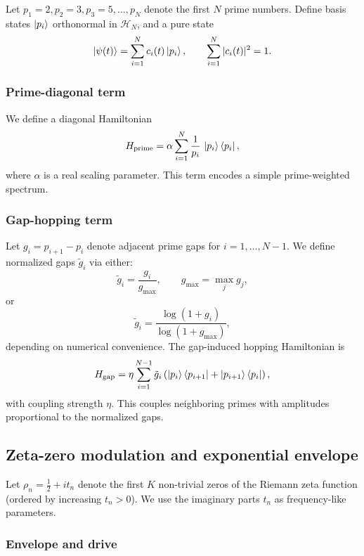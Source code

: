 \documentclass[11pt]{article}
\begin{document}
Let $p_1=2,p_2=3,p_3=5,\dots,p_N$ denote the first $N$ prime numbers. Define basis states $\ket{p_i}$ orthonormal in $\mathcal{H}_N$, and a pure state
\[
\ket{\psi(t)} = \sum_{i=1}^N c_i(t)\ket{p_i},\qquad \sum_{i=1}^N |c_i(t)|^2=1.
\]

\subsubsection{Prime-diagonal term}

We define a diagonal Hamiltonian
\begin{equation}
  H_{\mathrm{prime}} = \alpha\sum_{i=1}^N \frac{1}{p_i}\,\ket{p_i}\bra{p_i},
\end{equation}
where $\alpha$ is a real scaling parameter. This term encodes a simple prime-weighted spectrum.

\subsubsection{Gap-hopping term}

Let $g_i = p_{i+1}-p_i$ denote adjacent prime gaps for $i=1,\dots,N-1$. We define normalized gaps $\tilde g_i$ via either:
\begin{equation}
  \tilde g_i = \frac{g_i}{g_{\max}},\qquad g_{\max}=\max_j g_j,
\end{equation}
or
\begin{equation}
  \tilde g_i = \frac{\log(1+g_i)}{\log(1+g_{\max})},
\end{equation}
depending on numerical convenience. The gap-induced hopping Hamiltonian is
\begin{equation}
  H_{\mathrm{gap}} = \eta\sum_{i=1}^{N-1} \tilde g_i\left(\ket{p_i}\bra{p_{i+1}} + \ket{p_{i+1}}\bra{p_i}\right),
\end{equation}
with coupling strength $\eta$. This couples neighboring primes with amplitudes proportional to the normalized gaps.

\subsection{Zeta-zero modulation and exponential envelope}

Let $\rho_n = \frac12 + i t_n$ denote the first $K$ non-trivial zeros of the Riemann zeta function (ordered by increasing $t_n>0$). We use the imaginary parts $t_n$ as frequency-like parameters.

\subsubsection{Envelope and drive}
\end{document}
